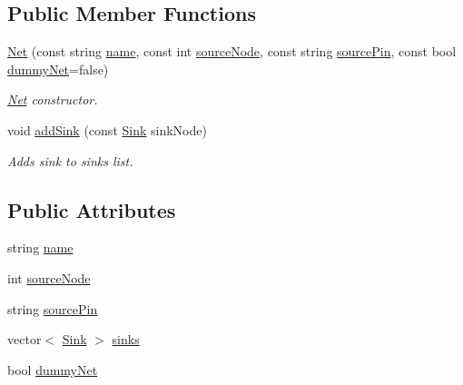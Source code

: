 \subsection*{Public Member Functions}
\begin{DoxyCompactItemize}
\item 
\hyperlink{structCircuit__Netlist_1_1Net_acebd510f80cda6c9c480b5e313978895}{Net} (const string \hyperlink{structCircuit__Netlist_1_1Net_aaf85019638c09259b055dc0d1352054a}{name}, const int \hyperlink{structCircuit__Netlist_1_1Net_a92ee3950fbcbe247f1d98c180ebb4813}{source\-Node}, const string \hyperlink{structCircuit__Netlist_1_1Net_a44ebd7aa36b2d81b127527a09654f99e}{source\-Pin}, const bool \hyperlink{structCircuit__Netlist_1_1Net_aad21a10a91330fd07d89ffccf21b55f8}{dummy\-Net}=false)
\begin{DoxyCompactList}\small\item\em \hyperlink{structCircuit__Netlist_1_1Net}{Net} constructor. \end{DoxyCompactList}\item 
void \hyperlink{structCircuit__Netlist_1_1Net_af5bf832949516e3d7e16957206809027}{add\-Sink} (const \hyperlink{structCircuit__Netlist_1_1Sink}{Sink} sink\-Node)
\begin{DoxyCompactList}\small\item\em Adds sink to sinks list. \end{DoxyCompactList}\end{DoxyCompactItemize}
\subsection*{Public Attributes}
\begin{DoxyCompactItemize}
\item 
string \hyperlink{structCircuit__Netlist_1_1Net_aaf85019638c09259b055dc0d1352054a}{name}
\item 
int \hyperlink{structCircuit__Netlist_1_1Net_a92ee3950fbcbe247f1d98c180ebb4813}{source\-Node}
\item 
string \hyperlink{structCircuit__Netlist_1_1Net_a44ebd7aa36b2d81b127527a09654f99e}{source\-Pin}
\item 
vector$<$ \hyperlink{structCircuit__Netlist_1_1Sink}{Sink} $>$ \hyperlink{structCircuit__Netlist_1_1Net_a99d49ffd915347f780cae8fa9cbbd841}{sinks}
\item 
bool \hyperlink{structCircuit__Netlist_1_1Net_aad21a10a91330fd07d89ffccf21b55f8}{dummy\-Net}
\end{DoxyCompactItemize}


